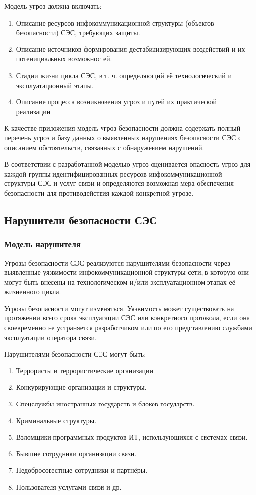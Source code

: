 \documentclass[12pt, russian, oneside, article]{ncc}
\begin{document}
Модель угроз должна включать:
\begin{enumerate}
\item Описание ресурсов инфокоммуникационной структуры (объектов безопасности) СЭС, требующих защиты.
\item Описание источников формирования дестабилизирующих воздействий и их потенициальных возможностей.
\item Стадии жизни цикла СЭС, в т. ч. определяющий её технологический и эксплуатационный этапы.
\item Описание процесса возникновения угроз и путей их практической реализации.
\end{enumerate}

К качестве приложения модель угроз безопасности должна содержать полный перечень угроз и базу данных о выявленных нарушениях безопасности СЭС с описанием обстоятельств, связанных с обнаружением нарушений.

В соответствии с разработанной моделью угроз оценивается опасность угроз для каждой группы идентифицированных ресурсов инфокоммуникационной структуры СЭС и услуг связи и определяются возможная мера обеспечения безопасности для противодействия каждой конкретной угрозе.
\subsection{Нарушители безопасности СЭС}
\label{sec-1_2}
\subsubsection{Модель нарушителя}
\label{sec-1_2_1}


Угрозы безопасности СЭС реализуются нарушителями безопасности через выявленные уязвимости инфокоммуникационной структуры сети, в которую они могут быть внесены на технологическом и/или эксплуатационном этапах её жизненного цикла.

Угрозы безопасности могут изменяться. Уязвимость может существовать на протяжении всего срока эксплуатации СЭС или конкретного протокола, если она своевременно не устраняется разработчиком или по его представлению службами эксплуатации оператора связи.

Нарушителями безопасности СЭС могут быть:
\begin{enumerate}
\item Террористы и террористические организации.
\item Конкурирующие организации и структуры.
\item Спецслужбы иностранных государств и блоков государств.
\item Криминальные структуры.
\item Взломщики программных продуктов ИТ, использующихся с системах связи.
\item Бывшие сотрудники организации связи.
\item Недобросовестные сотрудники и партнёры.
\item Пользователя услугами связи и др.
\end{enumerate}
\end{document}
